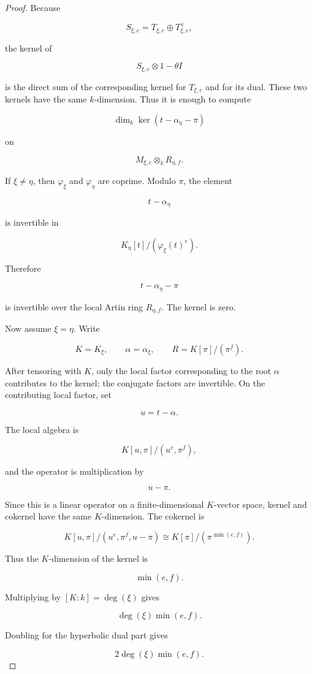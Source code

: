 \documentclass[11pt]{article}
\begin{document}
\begin{proof}

Because

\[
S_{\xi,e}=T_{\xi,e}\oplus T_{\xi,e}^\vee,
\]

the kernel of

\[
S_{\xi,e}\otimes1-\theta I
\]

is the direct sum of the corresponding kernel for $T_{\xi,e}$ and for its dual. These two kernels have the same $k$-dimension. Thus it is enough to compute

\[
\dim_k\ker(t-\alpha_\eta-\pi)
\]

on

\[
M_{\xi,e}\otimes_kR_{\eta,f}.
\]

If $\xi\neq\eta$, then $\varphi_\xi$ and $\varphi_\eta$ are coprime. Modulo $\pi$, the element

\[
t-\alpha_\eta
\]

is invertible in

\[
K_\eta[t]/(\varphi_\xi(t)^e).
\]

Therefore

\[
t-\alpha_\eta-\pi
\]

is invertible over the local Artin ring $R_{\eta,f}$. The kernel is zero.

Now assume $\xi=\eta$. Write

\[
K=K_\xi,
\qquad
\alpha=\alpha_\xi,
\qquad
R=K[\pi]/(\pi^f).
\]

After tensoring with $K$, only the local factor corresponding to the root $\alpha$ contributes to the kernel; the conjugate factors are invertible. On the contributing local factor, set

\[
u=t-\alpha.
\]

The local algebra is

\[
K[u,\pi]/(u^e,\pi^f),
\]

and the operator is multiplication by

\[
u-\pi.
\]

Since this is a linear operator on a finite-dimensional $K$-vector space, kernel and cokernel have the same $K$-dimension. The cokernel is

\[
K[u,\pi]/(u^e,\pi^f,u-\pi)
\cong
K[\pi]/(\pi^{\min(e,f)}).
\]

Thus the $K$-dimension of the kernel is

\[
\min(e,f).
\]

Multiplying by $[K:k]=\deg(\xi)$ gives

\[
\deg(\xi)\min(e,f).
\]

Doubling for the hyperbolic dual part gives

\[
2\deg(\xi)\min(e,f).
\]

\end{proof}
\end{document}
